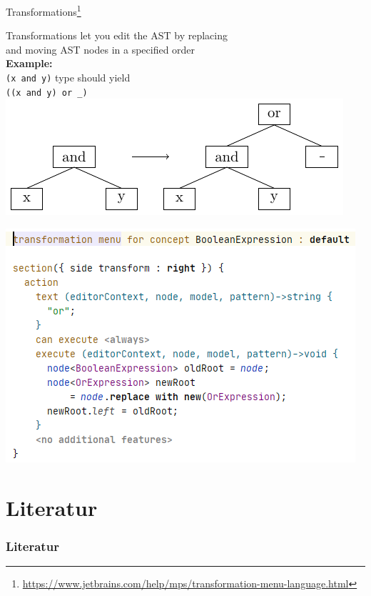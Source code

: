 	\begin{frame}{Transformations\footnote{\url{https://www.jetbrains.com/help/mps/transformation-menu-language.html}}}
		\begin{minipage}{0.52\textwidth}
			Transformations let you edit the AST by replacing \\
			and moving AST nodes in a specified order\\
			
			\textbf{Example:}\\
			\texttt{(x and y)} type  should yield \\
			\texttt{((x and y) or \_)}\\
			\includegraphics[height=0.4\textheight]{tikz/transformation.pdf}
		\end{minipage}
		\begin{minipage}{0.4\textwidth}
			\includegraphics[height=0.75\textheight]{illustrations/transformation.png}
		\end{minipage}
	\end{frame}

    \section{Literatur}

    \begin{frame}[t, allowframebreaks]
        \frametitle{Literatur}
        \printbibliography
    \end{frame}



